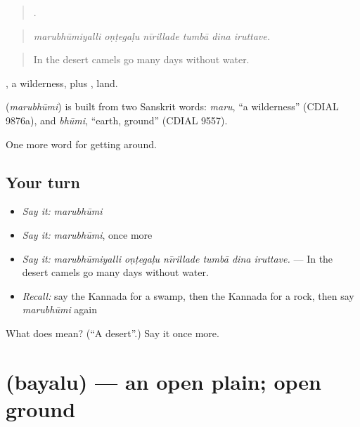 \begin{quote}
     .
\end{quote}

\begin{quote}
\emph{marubhūmiyalli oṇṭegaḷu nīrillade tumbā dina iruttave.}
\end{quote}

\begin{quote}
In the desert camels go many days without water.
\end{quote}

, a wilderness, plus , land.

\begin{cousinweb}
\textbf{} (\emph{marubhūmi}) is built from two Sanskrit words: \emph{maru}, \textquotedblleft{}a wilderness\textquotedblright{} (CDIAL 9876a), and \emph{bhūmi}, \textquotedblleft{}earth, ground\textquotedblright{} (CDIAL 9557).
\end{cousinweb}

\begin{grammarlens}[title={What you've built}]
One more word for getting around.
\end{grammarlens}

\subsection*{Your turn}
\begin{itemize}
\raggedright
  \item \emph{Say it:} \emph{marubhūmi}
  \item \emph{Say it:} \emph{marubhūmi}, once more
  \item \emph{Say it:} \emph{marubhūmiyalli oṇṭegaḷu nīrillade tumbā dina iruttave.} — In the desert camels go many days without water.
  \item \emph{Recall:} say the Kannada for a swamp, then the Kannada for a rock, then say \emph{marubhūmi} again
\end{itemize}

\begin{tcolorbox}[breakable,colback=teal!4,colframe=teal!35!black,title={Before you move on}]
What does  mean? (\textquotedblleft{}A desert\textquotedblright{}.) Say it once more.
\end{tcolorbox}
\section[\texorpdfstring{\kn{ಬಯಲು} (bayalu)}{ಬಯಲು (bayalu)}]{ (bayalu) — an open plain; open ground}

